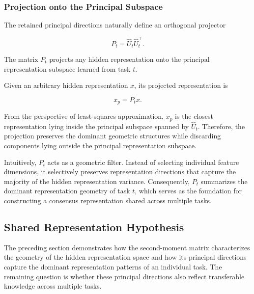 \documentclass[a4paper]{article}
\begin{document}

\subsubsection{Projection onto the Principal Subspace}

The retained principal directions naturally define an orthogonal projector

\begin{equation}
P_t
=
\hat U_t
\hat U_t^{\top}.
\end{equation}

The matrix $P_t$ projects any hidden representation onto the principal representation subspace learned from task $t$.

Given an arbitrary hidden representation $x$, its projected representation is

\begin{equation}
x_p
=
P_t x.
\end{equation}

From the perspective of least-squares approximation, $x_p$ is the closest representation lying inside the principal subspace spanned by $\hat U_t$. Therefore, the projection preserves the dominant geometric structures while discarding components lying outside the principal representation subspace.

Intuitively, $P_t$ acts as a geometric filter. Instead of selecting individual feature dimensions, it selectively preserves representation directions that capture the majority of the hidden representation variance. Consequently, $P_t$ summarizes the dominant representation geometry of task $t$, which serves as the foundation for constructing a consensus representation shared across multiple tasks.

\subsection{Shared Representation Hypothesis}

The preceding section demonstrates how the second-moment matrix characterizes the geometry of the hidden representation space and how its principal directions capture the dominant representation patterns of an individual task. The remaining question is whether these principal directions also reflect transferable knowledge across multiple tasks.
\end{document}
